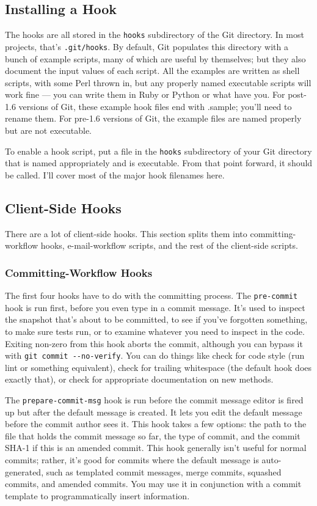 \documentclass[a4paper]{book}
\newcounter{tab}[chapter]
\begin{document}
\subsection{Installing a Hook}

The hooks are all stored in the \texttt{hooks} subdirectory of the Git directory. In most projects, that's \texttt{.git/hooks}. By default, Git populates this directory with a bunch of example scripts, many of which are useful by themselves; but they also document the input values of each script. All the examples are written as shell scripts, with some Perl thrown in, but any properly named executable scripts will work fine --- you can write them in Ruby or Python or what have you. For post-1.6 versions of Git, these example hook files end with .sample; you'll need to rename them. For pre-1.6 versions of Git, the example files are named properly but are not executable.

To enable a hook script, put a file in the \texttt{hooks} subdirectory of your Git directory that is named appropriately and is executable. From that point forward, it should be called. I'll cover most of the major hook filenames here.

\subsection{Client-Side Hooks}

There are a lot of client-side hooks. This section splits them into committing-workflow hooks, e-mail-workflow scripts, and the rest of the client-side scripts.

\subsubsection{Committing-Workflow Hooks}

The first four hooks have to do with the committing process. The \texttt{pre-commit} hook is run first, before you even type in a commit message. It's used to inspect the snapshot that's about to be committed, to see if you've forgotten something, to make sure tests run, or to examine whatever you need to inspect in the code. Exiting non-zero from this hook aborts the commit, although you can bypass it with \texttt{git commit -{}-no-verify}. You can do things like check for code style (run lint or something equivalent), check for trailing whitespace (the default hook does exactly that), or check for appropriate documentation on new methods.

The \texttt{prepare-commit-msg} hook is run before the commit message editor is fired up but after the default message is created. It lets you edit the default message before the commit author sees it. This hook takes a few options: the path to the file that holds the commit message so far, the type of commit, and the commit SHA-1 if this is an amended commit. This hook generally isn't useful for normal commits; rather, it's good for commits where the default message is auto-generated, such as templated commit messages, merge commits, squashed commits, and amended commits. You may use it in conjunction with a commit template to programmatically insert information.
\end{document}
